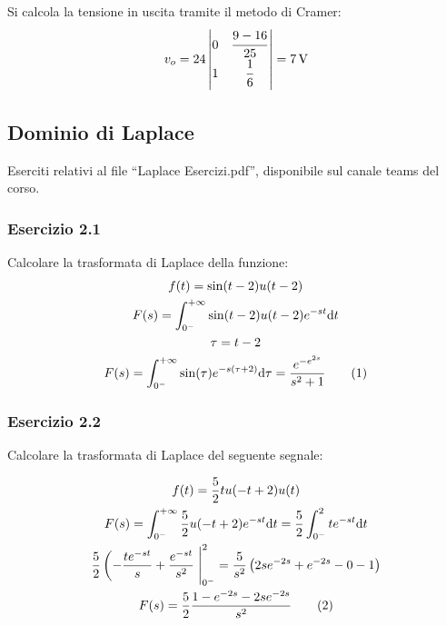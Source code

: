 \documentclass{article}
\newcommand{\tageq}{\tag{\stepcounter{equation}\theequation}}
\newcommand{\df}{\mathrm{d}}
\begin{document}
Si calcola la tensione in uscita tramite il metodo di Cramer:
\begin{equation}
    v_o=24\begin{vmatrix}
        0&\displaystyle\frac{\strut9-16}{25}\\
        1&\displaystyle\frac{\strut1}{\strut6}
    \end{vmatrix}=7\,\mathrm{V}
\end{equation}

\clearpage

\subsection{Dominio di Laplace}

Eserciti relativi al file ``Laplace Esercizi.pdf'', disponibile sul canale teams del corso.

\subsubsection*{Esercizio 2.1}

Calcolare la trasformata di Laplace della funzione:
\begin{gather*}
    f(t)=\sin(t-2)u(t-2)\\
    F(s)=\displaystyle\int_{0^-}^{+\infty}\sin(t-2)u(t-2)e^{-st}\df t\\
    \tau=t-2\\
    F(s)=\displaystyle\int_{0^-}^{+\infty}\sin(\tau)e^{-s(\tau+2)}\df\tau=\frac{e^{-e^{2s}}}{s^2+1}\tageq
\end{gather*}

\subsubsection*{Esercizio 2.2}

Calcolare la trasformata di Laplace del seguente segnale:
\begin{center}
\end{center}
\begin{gather*}
    f(t)=\displaystyle\frac{5}{2}tu(-t+2)u(t)\\
    F(s)=\displaystyle\int_{0^-}^{+\infty}\frac{5}{2}u(-t+2)e^{-st}\df t=\frac{5}{2}\int_{0^-}^2te^{-st}\df t\\
    \displaystyle\frac{5}{2}\left(-\frac{te^{-st}}{s}+\frac{e^{-st}}{s^2}\right.\Bigg|_{0^-}^2=\frac{5}{s^2}\left(2se^{-2s}+e^{-2s}-0-1\right)\\
    F(s)=\displaystyle\frac{5}{2}\frac{1-e^{-2s}-2se^{-2s}}{s^2}\tageq
\end{gather*}
\end{document}
